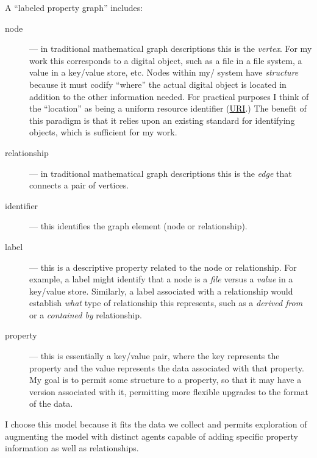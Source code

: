 \documentclass[sigconf,anonymous,review]{acmart}
\begin{document}
A ``labeled property graph'' includes:

\begin{description}
    \item[node] --- in traditional mathematical graph descriptions this is the
    \emph{vertex}.  For my work this corresponds to a digital object, such as a
    file in a file system, a value in a key/value store, etc. Nodes within my/
    system have \emph{structure} because it must codify ``where'' the actual
    digital object is located in addition to the other information needed.  For
    practical purposes I think of the ``location'' as being a uniform resource
    identifier (\href{https://datatracker.ietf.org/doc/html/rfc8820}{URI}.)  The
    benefit of this paradigm is that it relies upon an existing standard for
    identifying objects, which is sufficient for my work.

    \item[relationship] --- in traditional mathematical graph descriptions this
    is the \emph{edge} that connects a pair of vertices.

    \item[identifier] --- this identifies the graph element (node or relationship).

    \item[label] --- this is a descriptive property related to the node or
    relationship.  For example, a label might identify that a node is a
    \emph{file} versus a \emph{value} in a key/value store.  Similarly, a label
    associated with a relationship would establish \emph{what} type of
    relationship this represents, such as a \emph{derived from} or a
    \emph{contained by} relationship.

    \item[property] --- this is essentially a key/value pair, where the key
    represents the property and the value represents the data associated with
    that property.  My goal is to permit some structure to a property, so that
    it may have a version associated with it, permitting more flexible upgrades
    to the format of the data.

\end{description}

I choose this model because it fits the data we collect and permits exploration
of augmenting the model with distinct agents capable of adding specific property
information as well as relationships.
\end{document}

